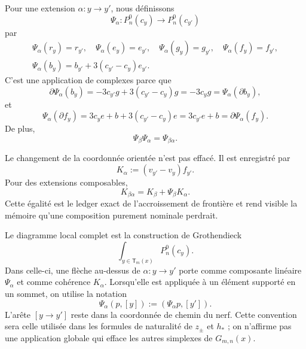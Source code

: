 Pour une extension \(\alpha:y\to y'\), nous définissons
\begin{equation}\label{eq:detint-psi}
 \Psi_\alpha:P_n^0(c_y)\longrightarrow P_n^0(c_{y'})
\end{equation}
par
\begin{equation}\label{eq:detint-psi-generadores}
\begin{gathered}
 \Psi_\alpha(r_y)=r_{y'},\quad
 \Psi_\alpha(e_y)=e_{y'},\quad
 \Psi_\alpha(g_y)=g_{y'},\quad
 \Psi_\alpha(f_y)=f_{y'},\\
 \Psi_\alpha(b_y)=b_{y'}+3(c_{y'}-c_y)e_{y'}.
\end{gathered}
\end{equation}
C'est une application de complexes parce que
\begin{equation}\label{eq:detint-psi-b-chain}
 \partial\Psi_\alpha(b_y)
 =-3c_{y'}g+3(c_{y'}-c_y)g
 =-3c_yg
 =\Psi_\alpha(\partial b_y),
\end{equation}
et
\begin{equation}\label{eq:detint-psi-f-chain}
 \Psi_\alpha(\partial f_y)
 =3c_ye+b+3(c_{y'}-c_y)e
 =3c_{y'}e+b
 =\partial\Psi_\alpha(f_y).
\end{equation}
De plus,
\begin{equation}\label{eq:detint-psi-functorial}
 \Psi_\beta\Psi_\alpha=\Psi_{\beta\alpha}.
\end{equation}

Le changement de la coordonnée orientée n'est pas effacé. Il est enregistré par
\begin{equation}\label{eq:detint-k-alpha}
 K_\alpha:=(v_{y'}-v_y)f_{y'}.
\end{equation}
Pour des extensions composables,
\begin{equation}\label{eq:detint-k-coherencia}
 K_{\beta\alpha}=K_\beta+\Psi_\beta K_\alpha.
\end{equation}
Cette égalité est le ledger exact de l'accroissement de frontière et rend visible
la mémoire qu'une composition purement nominale perdrait.

Le diagramme local complet est la construction de Grothendieck
\begin{equation}\label{eq:detint-grothendieck-local}
 \int_{y\in\mathsf T_m(x)}P_n^0(c_y).
\end{equation}
Dans celle-ci, une flèche au-dessus de \(\alpha:y\to y'\) porte comme composante linéaire
\(\Psi_\alpha\) et comme cohérence \(K_\alpha\). Lorsqu'elle est appliquée à un
élément supporté en un sommet, on utilise la notation
\begin{equation}\label{eq:detint-psi-soporte-vertice}
 \Psi_\alpha(p,[y]):=(\Psi_\alpha p,[y']).
\end{equation}
L'arête \([y\to y']\) reste dans la coordonnée de chemin du nerf. Cette
convention sera celle utilisée dans les formules de naturalité de
\(z_\pm\) et \(h_*\) ; on n'affirme pas une application globale qui efface les autres
simplexes de \(G_{m,n}(x)\).


